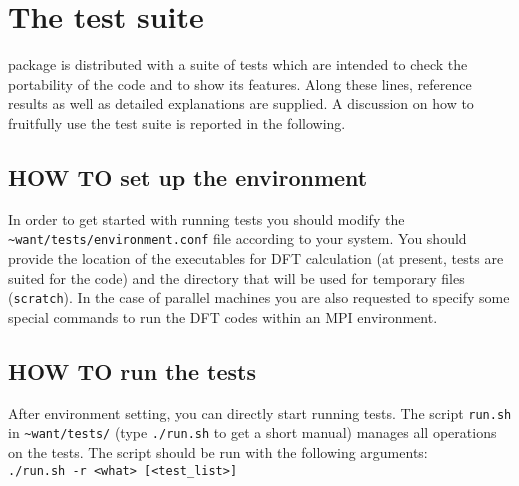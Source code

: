 
\thispagestyle{empty}
\section{The test suite}
\label{section:test}
%
\WANT{} package is distributed with a suite of tests which are
intended to check the portability of the code and to show its
features. Along these lines, reference results as well as detailed
explanations are supplied.  A discussion on how to fruitfully use
the test suite is reported in the following.

\subsection*{HOW TO set up the environment}
     In order to get started with running tests you should modify the
     {\tt \~{}want/tests/environment.conf} file according to your system.
     You should provide the location of the executables for DFT calculation
     (at present, tests are suited for the \PWSCF{} code) and the directory
     that will be used for temporary files ({\tt scratch}).
     In the case of parallel machines you are also requested to
     specify some special commands to run the DFT codes within an
     MPI environment.

\subsection*{HOW TO run the tests}
     After environment setting, you can directly start running tests. The
     script {\tt run.sh} in {\tt \~{}want/tests/} (type {\tt ./run.sh} to get a
     short manual) manages all operations on the tests.
     The script should be run with the following arguments: \\

     {\tt  ./run.sh -r <what>  [<test\_list>] } \\

